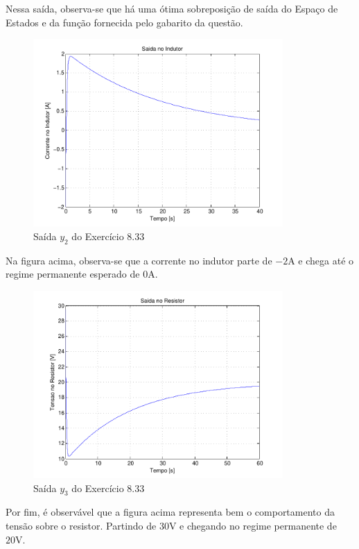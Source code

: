 \documentclass{report}
\begin{document}
Nessa saída, observa-se que há uma ótima sobreposição de saída do Espaço de Estados e da função fornecida pelo gabarito da questão.
\clearpage
\begin{figure}[h!]
    \centering
    \includegraphics[width=0.85\textwidth]{images/plots/plot_8_33_y2.pdf}
    \caption{\label{plot:8.33_y2} Saída $ y_2 $ do Exercício 8.33}
\end{figure}

Na figura acima, observa-se que a corrente no indutor parte de $ -2\text{A} $ e chega até o regime permanente esperado de $ 0\text{A} $.

\begin{figure}[h!]
    \centering
    \includegraphics[width=0.85\textwidth]{images/plots/plot_8_33_y3.pdf}
    \caption{\label{plot:8.33_y3} Saída $ y_3 $ do Exercício 8.33}
\end{figure}

Por fim, é observável que a figura acima representa bem o comportamento da tensão sobre o resistor. Partindo de $ 30\text{V} $ e chegando no regime
permanente de $ 20 \text{V} $.
\end{document}
